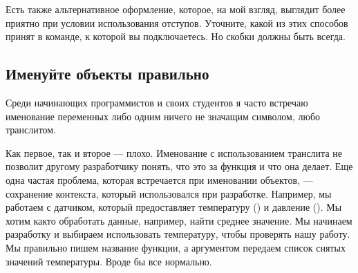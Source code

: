 \documentclass[letterpaper,10pt,russian]{sphinxmanual}
\begin{document}
\sphinxAtStartPar
Есть также альтернативное оформление, которое, на мой взгляд, выглядит более приятно при условии использования отступов. Уточните, какой из этих способов принят в команде, к которой вы подключаетесь. Но скобки должны быть всегда.

\begin{sphinxVerbatim}[commandchars=\\\{\}]
\end{sphinxVerbatim}


\subsection{Именуйте объекты правильно}
\label{\detokenize{educational_materials/styles/content:id5}}
\sphinxAtStartPar
Среди начинающих программистов и своих студентов я часто встречаю именование переменных либо одним ничего не значащим символом, любо транслитом.

\begin{sphinxVerbatim}[commandchars=\\\{\}]
 
       
\end{sphinxVerbatim}

\sphinxAtStartPar
Как первое, так и второе — плохо. Именование с использованием транслита не позволит другому разработчику понять, что это за функция и что она делает. Еще одна частая проблема, которая встречается при именовании объектов, — сохранение контекста, который использовался при разработке. Например, мы работаем с датчиком, который предоставляет температуру () и давление (). Мы хотим как\sphinxhyphen{}то обработать данные, например, найти среднее значение. Мы начинаем разработку и выбираем использовать температуру, чтобы проверять нашу работу. Мы правильно пишем название функции, а аргументом передаем список снятых значений температуры. Вроде бы все нормально.
\end{document}
